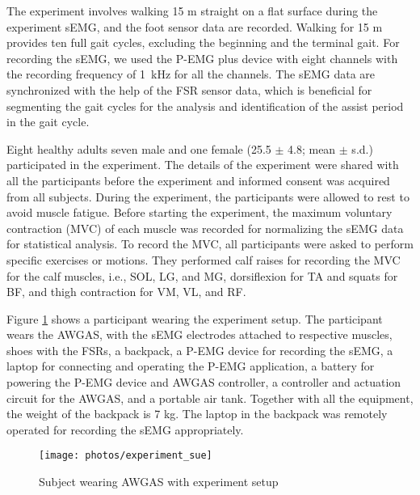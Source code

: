 \documentclass[paper,JRM,paper]{jaciiiarticle}
\begin{document}
The experiment involves walking 15 m straight on a flat surface during the experiment sEMG, and the foot sensor data are recorded. Walking for 15 m provides ten full gait cycles, excluding the beginning and the terminal gait.  For recording the sEMG, we used the P-EMG plus device with eight channels with the recording frequency of \SI{1}{\kilo\hertz} for all the channels. The sEMG data are synchronized with the help of the FSR sensor data, which is beneficial for segmenting the gait cycles for the analysis and identification of the assist period in the gait cycle. 

Eight healthy adults seven male and one female (25.5 $\pm$ 4.8; mean $\pm$ s.d.) participated in the experiment. The details of the experiment were shared with all the participants before the experiment  and informed consent was acquired from all subjects. During the experiment, the participants were allowed to rest to avoid muscle fatigue. Before starting the experiment, the maximum voluntary contraction (MVC) of each muscle was recorded for normalizing the sEMG data for statistical analysis. To record the MVC, all participants were asked to perform specific exercises or motions. They performed calf raises for recording the MVC for the calf muscles, i.e., SOL, LG, and MG, dorsiflexion for TA and squats for BF, and thigh contraction for VM, VL, and RF.

Figure \ref{fig:experiment} shows a participant wearing the experiment setup. The participant wears the AWGAS, with the sEMG electrodes attached to respective muscles, shoes with the FSRs, a backpack, a P-EMG device for recording the sEMG, a laptop for connecting and operating the P-EMG application, a battery for powering the P-EMG device and AWGAS controller, a controller and actuation circuit for the AWGAS, and a portable air tank. Together with all the equipment, the weight of the backpack is 7 kg. The laptop in the backpack was remotely operated for recording the sEMG appropriately.


\begin{figure}[h]
	\centering
	\texttt{[image: photos/experiment\_sue]}
	\caption{Subject wearing AWGAS with experiment setup}
	\label{fig:experiment}
\end{figure}
\end{document}
